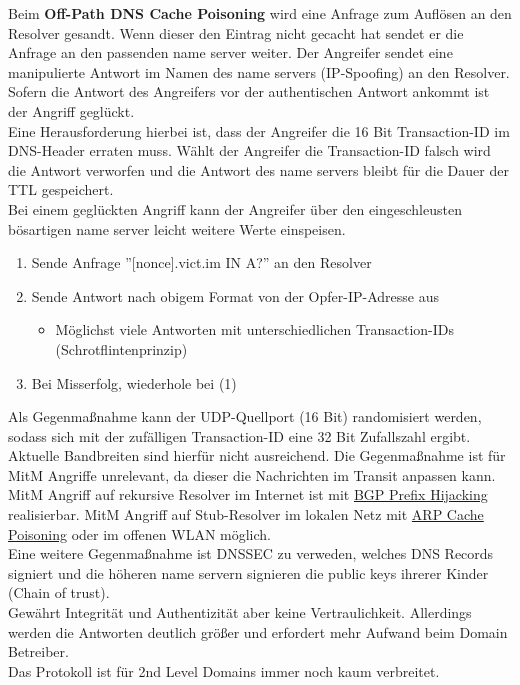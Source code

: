 \documentclass[a4paper,12pt,leqno]{article}
\begin{document}
Beim \textbf{Off-Path DNS Cache Poisoning} wird eine Anfrage zum Auflösen an den Resolver gesandt. Wenn dieser den Eintrag nicht gecacht hat sendet er die Anfrage an den passenden name server weiter. Der Angreifer sendet eine manipulierte Antwort im Namen des name servers (IP-Spoofing) an den Resolver. Sofern die Antwort des Angreifers vor der authentischen Antwort ankommt ist der Angriff geglückt.\\
Eine Herausforderung hierbei ist, dass der Angreifer die 16 Bit Transaction-ID im DNS-Header erraten muss. Wählt der Angreifer die Transaction-ID falsch wird die Antwort verworfen und die Antwort des name servers bleibt für die Dauer der TTL gespeichert.\\
Bei einem geglückten Angriff kann der Angreifer über den eingeschleusten bösartigen name server leicht weitere Werte einspeisen.\\
\begin{enumerate}
\item Sende Anfrage ''[nonce].vict.im IN A?'' an den Resolver
\item Sende Antwort nach obigem Format von der Opfer-IP-Adresse aus
	\begin{itemize}
	\item Möglichst viele Antworten mit unterschiedlichen Transaction-IDs (Schrotflintenprinzip)
	\end{itemize}
\item Bei Misserfolg, wiederhole bei (1)
\end{enumerate}
Als Gegenmaßnahme kann der UDP-Quellport (16 Bit) randomisiert werden, sodass sich mit der zufälligen Transaction-ID eine 32 Bit Zufallszahl ergibt. Aktuelle Bandbreiten sind hierfür nicht ausreichend. Die Gegenmaßnahme ist für MitM Angriffe unrelevant, da dieser die Nachrichten im Transit anpassen kann.\\

MitM Angriff auf rekursive Resolver im Internet ist mit \hyperref[txt:BGP-PrefixHijacking]{BGP Prefix Hijacking} realisierbar. MitM Angriff auf Stub-Resolver im lokalen Netz mit \hyperref[txt:spoofing]{ARP Cache Poisoning} oder im offenen WLAN möglich.\\

Eine weitere Gegenmaßnahme ist DNSSEC zu verweden, welches DNS Records signiert und die höheren name servern signieren die public keys ihrerer Kinder (Chain of trust).\\
Gewährt Integrität und Authentizität aber keine Vertraulichkeit. 
Allerdings werden die Antworten deutlich größer und erfordert mehr Aufwand beim Domain Betreiber.\\
Das Protokoll ist für 2nd Level Domains immer noch kaum verbreitet.\\
\end{document}
